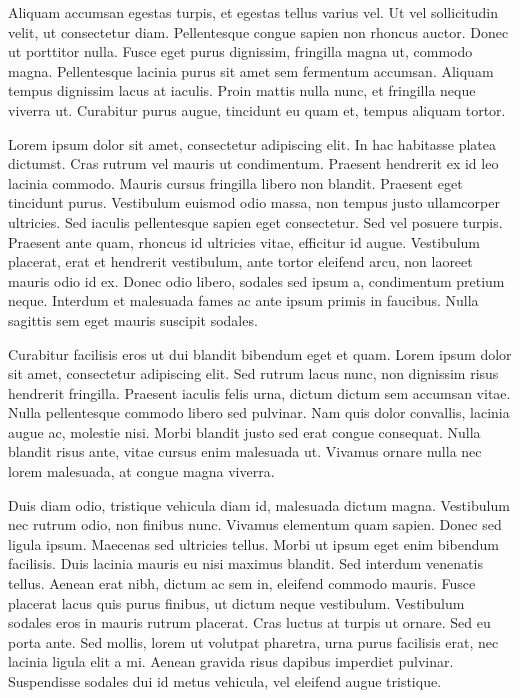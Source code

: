 \documentclass{homework}
\begin{document}
Aliquam accumsan egestas turpis, et egestas tellus varius vel. Ut vel sollicitudin velit, ut consectetur diam. Pellentesque congue sapien non rhoncus auctor. Donec ut porttitor nulla. Fusce eget purus dignissim, fringilla magna ut, commodo magna. Pellentesque lacinia purus sit amet sem fermentum accumsan. Aliquam tempus dignissim lacus at iaculis. Proin mattis nulla nunc, et fringilla neque viverra ut. Curabitur purus augue, tincidunt eu quam et, tempus aliquam tortor.

Lorem ipsum dolor sit amet, consectetur adipiscing elit. In hac habitasse platea dictumst. Cras rutrum vel mauris ut condimentum. Praesent hendrerit ex id leo lacinia commodo. Mauris cursus fringilla libero non blandit. Praesent eget tincidunt purus. Vestibulum euismod odio massa, non tempus justo ullamcorper ultricies. Sed iaculis pellentesque sapien eget consectetur. Sed vel posuere turpis. Praesent ante quam, rhoncus id ultricies vitae, efficitur id augue. Vestibulum placerat, erat et hendrerit vestibulum, ante tortor eleifend arcu, non laoreet mauris odio id ex. Donec odio libero, sodales sed ipsum a, condimentum pretium neque. Interdum et malesuada fames ac ante ipsum primis in faucibus. Nulla sagittis sem eget mauris suscipit sodales.

Curabitur facilisis eros ut dui blandit bibendum eget et quam. Lorem ipsum dolor sit amet, consectetur adipiscing elit. Sed rutrum lacus nunc, non dignissim risus hendrerit fringilla. Praesent iaculis felis urna, dictum dictum sem accumsan vitae. Nulla pellentesque commodo libero sed pulvinar. Nam quis dolor convallis, lacinia augue ac, molestie nisi. Morbi blandit justo sed erat congue consequat. Nulla blandit risus ante, vitae cursus enim malesuada ut. Vivamus ornare nulla nec lorem malesuada, at congue magna viverra.

Duis diam odio, tristique vehicula diam id, malesuada dictum magna. Vestibulum nec rutrum odio, non finibus nunc. Vivamus elementum quam sapien. Donec sed ligula ipsum. Maecenas sed ultricies tellus. Morbi ut ipsum eget enim bibendum facilisis. Duis lacinia mauris eu nisi maximus blandit. Sed interdum venenatis tellus. Aenean erat nibh, dictum ac sem in, eleifend commodo mauris. Fusce placerat lacus quis purus finibus, ut dictum neque vestibulum. Vestibulum sodales eros in mauris rutrum placerat. Cras luctus at turpis ut ornare. Sed eu porta ante. Sed mollis, lorem ut volutpat pharetra, urna purus facilisis erat, nec lacinia ligula elit a mi. Aenean gravida risus dapibus imperdiet pulvinar. Suspendisse sodales dui id metus vehicula, vel eleifend augue tristique.
\end{document}
